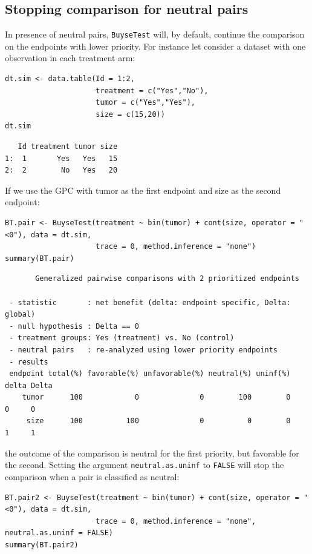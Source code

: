 \documentclass[12pt]{article}
\begin{document}
\clearpage

\subsection{Stopping comparison for neutral pairs}
\label{sec:orgbe26264}
In presence of neutral pairs, \texttt{BuyseTest} will, by default, continue
the comparison on the endpoints with lower priority. For instance let
consider a dataset with one observation in each treatment arm:
\lstset{language=r,label= ,caption= ,captionpos=b,numbers=none}
\begin{lstlisting}
dt.sim <- data.table(Id = 1:2,
                     treatment = c("Yes","No"),
                     tumor = c("Yes","Yes"),
                     size = c(15,20))
dt.sim
\end{lstlisting}

\begin{verbatim}
   Id treatment tumor size
1:  1       Yes   Yes   15
2:  2        No   Yes   20
\end{verbatim}


\bigskip

If we use the GPC with tumor as the first endpoint and size as the
second endpoint:
\lstset{language=r,label= ,caption= ,captionpos=b,numbers=none}
\begin{lstlisting}
BT.pair <- BuyseTest(treatment ~ bin(tumor) + cont(size, operator = "<0"), data = dt.sim,
                     trace = 0, method.inference = "none")
summary(BT.pair)
\end{lstlisting}

\begin{verbatim}
       Generalized pairwise comparisons with 2 prioritized endpoints

 - statistic       : net benefit (delta: endpoint specific, Delta: global) 
 - null hypothesis : Delta == 0 
 - treatment groups: Yes (treatment) vs. No (control) 
 - neutral pairs   : re-analyzed using lower priority endpoints
 - results
 endpoint total(%) favorable(%) unfavorable(%) neutral(%) uninf(%) delta Delta
    tumor      100            0              0        100        0     0     0
     size      100          100              0          0        0     1     1
\end{verbatim}

the outcome of the comparison is neutral for the first priority, but
favorable for the second. Setting the argument \texttt{neutral.as.uninf} to
\texttt{FALSE} will stop the comparison when a pair is classified as neutral:
\lstset{language=r,label= ,caption= ,captionpos=b,numbers=none}
\begin{lstlisting}
BT.pair2 <- BuyseTest(treatment ~ bin(tumor) + cont(size, operator = "<0"), data = dt.sim,
                     trace = 0, method.inference = "none", neutral.as.uninf = FALSE)
summary(BT.pair2)
\end{lstlisting}
\end{document}
